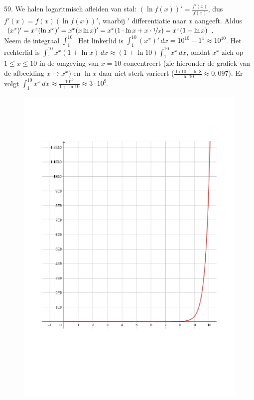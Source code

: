 \begin{problem}{59.}
	We halen logaritmisch afleiden van stal: $(\ln f(x))' = \frac{f'(x)}{f(x)}$, dus $f'(x) = f(x) (\ln f(x))'$, waarbij $'$ differentiatie naar $x$ aangeeft. Aldus $(x^x)' = x^x (\ln x^x)' = x^x (x \ln x)' = x^x (1 \cdot \ln x + x \cdot \nicefrac{1}{x}) = x^x (1 + \ln x)$.\\Neem de integraal $\int_{1}^{10}$. Het linkerlid is $\int_{1}^{10} (x^x)'\,dx = {10}^{10} - 1^1 \approx {10}^{10}$. Het rechterlid is $\int_{1}^{10} x^x (1 + \ln x)\,dx \approx (1 + \ln 10) \int_{1}^{10} x^x\,dx$, omdat $x^x$ zich op $1 \leq x \leq 10$ in de omgeving van $x = 10$ concentreert (zie hieronder de grafiek van de afbeelding $x \mapsto x^x$) en $\ln x$ daar niet sterk varieert ($\frac{\ln 10 - \ln 8}{\ln 10} \approx 0{,}097$). Er volgt $\int_{1}^{10} x^x\,dx \approx \frac{{10}^{10}}{1 + \ln 10} \approx 3 \cdot {10}^9$.
    \begin{figure}
		\includegraphics{resources/oplossing59}
	\end{figure}
\end{problem}

